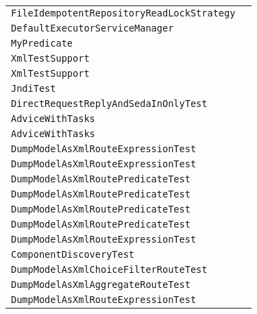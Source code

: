 \begin{center}
\begin{tabular}{ll}
\lstinline/FileIdempotentRepositoryReadLockStrategy/&\raisebox{0pt}{\lstinline/prepareOnStartup(GenericFileOperations<File>)/}\\
\lstinline/DefaultExecutorServiceManager/&\raisebox{0pt}{\lstinline/set(ThreadPoolProfile)/}\\
\lstinline/MyPredicate/&\raisebox{0pt}{\lstinline/booleanmatches(Exchange)/}\\
\lstinline/XmlTestSupport/&\raisebox{0pt}{\lstinline/RouteContainerassertParseAsJaxb(String)/}\\
\lstinline/XmlTestSupport/&\raisebox{0pt}{\lstinline/RestContainerassertParseRestAsJaxb(String)/}\\
\lstinline/JndiTest/&\raisebox{0pt}{\lstinline/testLookupOfTypedObject()/}\\
\lstinline/DirectRequestReplyAndSedaInOnlyTest/&\raisebox{0pt}{\lstinline/testInOut()/}\\
\lstinline/AdviceWithTasks/&\raisebox{0pt}{\lstinline/task()/}\\
\lstinline/AdviceWithTasks/&\raisebox{0pt}{\lstinline/task()/}\\
\lstinline/DumpModelAsXmlRouteExpressionTest/&\raisebox{0pt}{\lstinline/testDumpModelAsXmlXPath()/}\\
\lstinline/DumpModelAsXmlRouteExpressionTest/&\raisebox{0pt}{\lstinline/testDumpModelAsXmlHeader()/}\\
\lstinline/DumpModelAsXmlRoutePredicateTest/&\raisebox{0pt}{\lstinline/testDumpModelAsXml()/}\\
\lstinline/DumpModelAsXmlRoutePredicateTest/&\raisebox{0pt}{\lstinline/testDumpModelAsXmlHeader()/}\\
\lstinline/DumpModelAsXmlRoutePredicateTest/&\raisebox{0pt}{\lstinline/testDumpModelAsXmlXPath()/}\\
\lstinline/DumpModelAsXmlRoutePredicateTest/&\raisebox{0pt}{\lstinline/testDumpModelAsXmlBean()/}\\
\lstinline/DumpModelAsXmlRouteExpressionTest/&\raisebox{0pt}{\lstinline/testDumpModelAsXml()/}\\
\lstinline/ComponentDiscoveryTest/&\raisebox{0pt}{\lstinline/ComponentDocumentation()/}\\
\lstinline/DumpModelAsXmlChoiceFilterRouteTest/&\raisebox{0pt}{\lstinline/testDumpModelAsXml()/}\\
\lstinline/DumpModelAsXmlAggregateRouteTest/&\raisebox{0pt}{\lstinline/testDumpModelAsXml()/}\\
\lstinline/DumpModelAsXmlRouteExpressionTest/&\raisebox{0pt}{\lstinline/testDumpModelAsXmlBean()/}\\

\end{tabular}
\end{center}
